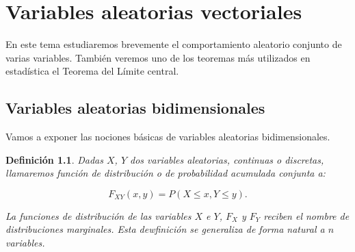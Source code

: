 \documentclass[12pt]{report}
\newtheorem{definition}{Definici\'on}
\begin{document}
\chapter{Variables aleatorias vectoriales}
En este tema estudiaremos brevemente el comportamiento aleatorio conjunto  de varias variables. También veremos
uno de los teoremas más utilizados en estadística el Teorema del Límite central.


\section{Variables aleatorias bidimensionales}

Vamos a exponer las nociones básicas de variables aleatorias bidimensionales.

\begin{definition}
Dadas $X$, $Y$ dos variables aleatorias, continuas o discretas, llamaremos función de distribución o de
probabilidad acumulada conjunta a:

$$ F_{X Y}(x,y)=P(X\leq x, Y\leq y).$$

La funciones de distribución de las variables $X$ e $Y$, $F_X$ y $F_Y$ reciben el nombre de
distribuciones marginales. Esta dewfinición se generaliza de forma natural a $n$ variables.
\end{definition}
\end{document}

